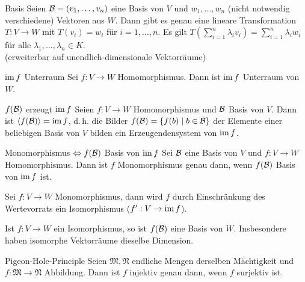 \begin{Satz}{Basis}
    Seien $\mathcal{B} = (v_1, \ldots, v_n)$ eine Basis von $V$
    und $w_1, \ldots, w_n$ (nicht notwendig verschiedene) Vektoren aus $W$.
    Dann gibt es genau eine lineare Transformation $T: V \rightarrow W$
    mit $T(v_i) = w_i$ für $i = 1, \ldots, n$.
    Es gilt $T\left(\sum_{i=1}^n \lambda_i v_i\right) =
    \sum_{i=1}^n \lambda_i w_i$ für alle
    $\lambda_1, \ldots, \lambda_n \in K$. \\
    (erweiterbar auf unendlich-dimensionale Vektorräume)
\end{Satz}

\begin{Satz}{$\operatorname{im} f$ Unterraum}
    Sei $f: V \rightarrow W$ Homomorphismus.
    Dann ist $\operatorname{im} f$ Unterraum von $W$.
\end{Satz}

\begin{Satz}{$f(\mathcal{B})$ erzeugt $\operatorname{im} f$}
    Seien $f: V \rightarrow W$ Homomorphismus und $\mathcal{B}$ Basis von $V$.
    Dann ist $\langle f(\mathcal{B}) \rangle = \operatorname{im} f$, d.\,h. die Bilder
    $f(\mathcal{B}) = \{f(b) \;|\; b \in \mathcal{B}\}$ der Elemente
    einer beliebigen Basis von $V$ bilden ein Erzeugendensystem von $\operatorname{im} f$.
\end{Satz}

\begin{Satz}{Monomorphismus $\Leftrightarrow f(\mathcal{B})$ Basis von $\operatorname{im} f$}
    Sei $\mathcal{B}$ eine Basis von $V$ und $f: V \rightarrow W$
    Homomorphismus.
    Dann ist $f$ Monomorphismus genau dann, wenn $f(\mathcal{B})$ Basis von
    $\operatorname{im} f$ ist.
\end{Satz}

\begin{Kor}
    Sei $f: V \rightarrow W$ Monomorphismus, dann wird $f$ durch Einschränkung
    des Wertevorrats ein Isomorphismus ($f': V \rightarrow \operatorname{im} f$).
\end{Kor}

\begin{Kor}
    Ist $f: V \rightarrow W$ ein Isomorphismus, so ist $f(\mathcal{B})$ eine
    Basis von $W$.
    Insbesondere haben isomorphe Vektorräume dieselbe Dimension.
\end{Kor}

\begin{Lemma}{Pigeon-Hole-Principle}
    Seien $\mathfrak{M}, \mathfrak{N}$ endliche Mengen derselben Mächtigkeit
    und \\
    $f: \mathfrak{M} \rightarrow \mathfrak{N}$ Abbildung.
    Dann ist $f$ injektiv genau dann, wenn $f$ surjektiv ist.
\end{Lemma}

